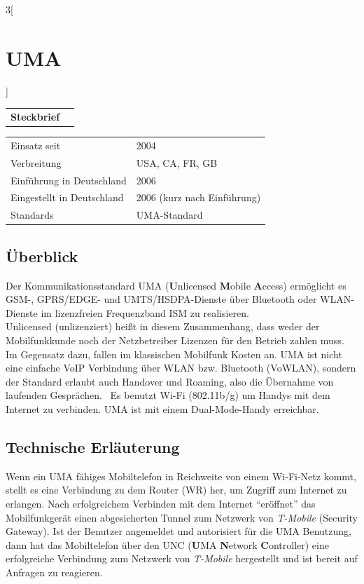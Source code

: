 \begin{multicols}{3}[\section{UMA}]


\newrefsegment

\begin{tabular}{p{}p{2.7 cm}}
\textbf{Steckbrief}& \\
\end{tabular}

\begin{tabular}{p{}p{2.7 cm}}
      Einsatz seit & 2004\\
      Verbreitung & USA, CA, FR, GB\\
	  Einführung in Deutschland & 2006\\
      Eingestellt in Deutschland & 2006 (kurz nach Einführung)\\
	  Standards & UMA-Standard\\
\end{tabular}
\par
\subsection*{Überblick}
Der Kommunikationsstandard UMA (\textbf{U}nlicensed \textbf{M}obile \textbf{A}ccess) ermöglicht es GSM-, GPRS/EDGE- und UMTS/HSDPA-Dienste über Bluetooth oder WLAN-Dienste im lizenzfreien Frequenzband ISM zu realisieren.\\	
Unlicensed (unlizenziert) heißt in diesem Zusammenhang, dass weder der Mobilfunkkunde noch der Netzbetreiber Lizenzen für den Betrieb zahlen muss. Im Gegensatz dazu, fallen im klassischen Mobilfunk Kosten an. UMA ist nicht eine einfache VoIP Verbindung über WLAN bzw. Bluetooth (VoWLAN), sondern der Standard erlaubt auch Handover und Roaming, also die Übernahme von laufenden Gesprächen.~\cite{uma.3}
Es benutzt Wi-Fi (802.11b/g) um Handys mit dem Internet zu verbinden. UMA ist mit einem Dual-Mode-Handy erreichbar.~\cite{uma.1}

\subsection*{Technische Erläuterung}
Wenn ein UMA fähiges Mobiltelefon in Reichweite von einem Wi-Fi-Netz kommt, stellt es eine Verbindung zu dem Router (WR) her, um Zugriff zum Internet zu erlangen. Nach erfolgreichem Verbinden mit dem Internet \enquote{eröffnet} das Mobilfunkgerät einen abgesicherten Tunnel zum Netzwerk von \textit{T-Mobile} (Security Gateway). Ist der Benutzer angemeldet und autorisiert für die UMA Benutzung, dann hat das Mobiltelefon über den UNC (\textbf{U}MA \textbf{N}etwork \textbf{C}ontroller) eine erfolgreiche Verbindung zum Netzwerk von \textit{T-Mobile} hergestellt und ist bereit auf Anfragen zu reagieren.~\cite{uma.1}


\end{multicols}
